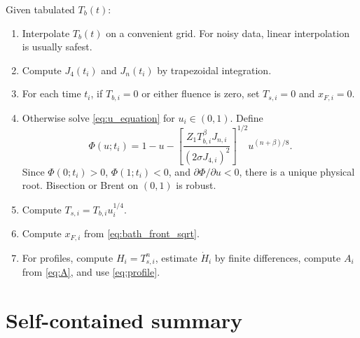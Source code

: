\documentclass[11pt]{article}
\newcommand{\Tb}{T_b}
\newcommand{\Jfour}{J_4}
\newcommand{\Jn}{J_n}
\begin{document}
Given tabulated $\Tb(t)$:
\begin{enumerate}
 \item Interpolate $\Tb(t)$ on a convenient grid.  For noisy data, linear interpolation is usually safest.
 \item Compute $\Jfour(t_i)$ and $\Jn(t_i)$ by trapezoidal integration.
 \item For each time $t_i$, if $T_{b,i}=0$ or either fluence is zero, set $T_{s,i}=0$ and $x_{F,i}=0$.
 \item Otherwise solve \eqref{eq:u_equation} for $u_i\in(0,1)$.  Define
 \begin{equation}
  \Phi(u;t_i)=1-u-
  \left[\frac{Z_1 T_{b,i}^\beta J_{n,i}}{(2\sigma J_{4,i})^2}\right]^{1/2}
  u^{(n+\beta)/8}.
 \end{equation}
 Since $\Phi(0;t_i)>0$, $\Phi(1;t_i)<0$, and $\partial\Phi/\partial u<0$,
 there is a unique physical root.  Bisection or Brent on $(0,1)$ is robust.
 \item Compute $T_{s,i}=T_{b,i} u_i^{1/4}$.
 \item Compute $x_{F,i}$ from \eqref{eq:bath_front_sqrt}.
 \item For profiles, compute $H_i=T_{s,i}^n$, estimate $\dot H_i$ by finite differences, compute $A_i$ from \eqref{eq:A}, and use \eqref{eq:profile}.
\end{enumerate}

\section{Self-contained summary}
\end{document}
